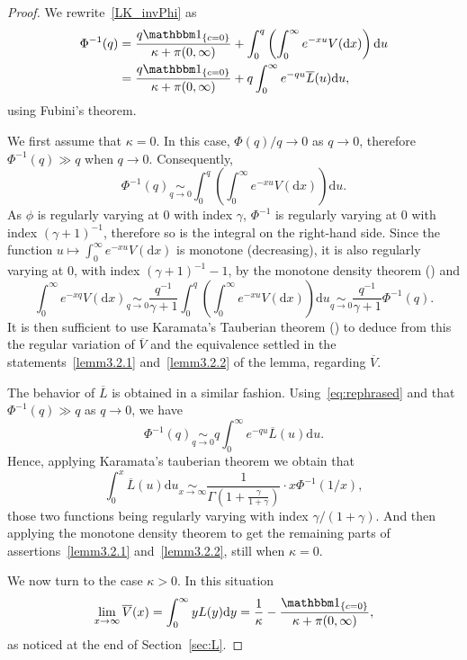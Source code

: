 \documentclass[10pt]{amsart}
\theoremstyle{definition}
\numberwithin{equation}{section}
\newcommand{\dd}{\mathrm{d}}
\renewcommand{\bar}[1]{\overline{#1}}
\begin{document}
\begin{proof}
We rewrite~\eqref{LK_invPhi} as
\begin{equation}\label{eq:rephrased}
\begin{split}
\Phi^{-1}(q) &=\frac{q \mathbbm 1_{\{c=0\}}}{\kappa+\pi(0,\infty)}+\int_0^q \left(\int_0^{\infty} e^{-xu}V(\dd x) \right) \dd u\\
&=\frac{q \mathbbm 1_{\{c=0\}}}{\kappa+\pi(0,\infty)}+q\int_0^{\infty}e^{-qu} \bar L(u) \dd u,
\end{split}
\end{equation}
using Fubini's theorem.

We first assume that $\kappa = 0$. In this case, $\Phi(q)/q \to 0$ as $q \to 0$, therefore $\Phi^{-1}(q) \gg q$ when $q \rightarrow 0$. Consequently,
\begin{equation}\label{eq:miseenplace}
\Phi^{-1}(q) \underset{q \rightarrow 0}{\sim} \int_0^q \left(\int_0^{\infty} e^{-xu}V(\dd x) \right) \dd u.
\end{equation}
As $\phi$ is regularly varying at $0$ with index $\gamma$, $\Phi^{-1}$ is regularly varying at $0$ with index $(\gamma+1)^{-1}$, therefore so is the integral on the right-hand side. Since the function $u \mapsto \int_0^{\infty} e^{-xu}V(\dd x)$ is monotone (decreasing), it is also regularly varying at $0$, with index $(\gamma+1)^{-1}-1$, by the monotone density theorem (\cite[Theorem~1.7.2b]{BGT}) and
\[
\int_0^{\infty} e^{-xq}V(\dd x) \underset{q \rightarrow 0}{\sim} \frac{q^{-1}}{\gamma+1} \int_0^q \left(\int_0^{\infty} e^{-xu}V(\dd x) \right) \dd u \underset{q \rightarrow 0}{\sim} \frac{q^{-1}}{\gamma+1} \Phi^{-1}(q).
\]
It is then sufficient to use Karamata's Tauberian theorem (\cite[Theorem~1.7.1]{BGT}) to deduce from this the regular variation of $\bar V$ and the equivalence settled in the statements~\eqref{lemm3.2.1} and~\eqref{lemm3.2.2} of the lemma, regarding $\bar V$.

The behavior of $\bar{L}$ is obtained in a similar fashion. Using~\eqref{eq:rephrased} and that $\Phi^{-1}(q) \gg q$ as $q \to 0$, we have
\[
\Phi^{-1}(q)\underset{q \rightarrow 0}{\sim} q \int_0^{\infty}e^{-qu} \bar{L}(u) \dd u.
\]
Hence, applying Karamata's tauberian theorem we obtain that
\[
\int_0^{x} \bar L(u) \dd u \underset{x \rightarrow \infty}{\sim} \frac{1}{\Gamma\left(1+\frac{\gamma}{1+\gamma}\right)} \cdot x \Phi^{-1}(1/x),
\]
those two functions being regularly varying with index $\gamma/(1+\gamma)$. And then applying the monotone density theorem to get the remaining parts of assertions~\eqref{lemm3.2.1} and~\eqref{lemm3.2.2}, still when $\kappa=0$.

We now turn to the case $\kappa > 0$. In this situation
\[
\lim_{x \to \infty} \bar{V}(x) = \int_0^\infty y L(y) \dd y =\frac{1}{\kappa}- \frac{\mathbbm 1_{\{c=0\}}}{\kappa +\pi(0,\infty)},
\]
as noticed at the end of Section~\ref{sec:L}.
\end{proof}
\end{document}
